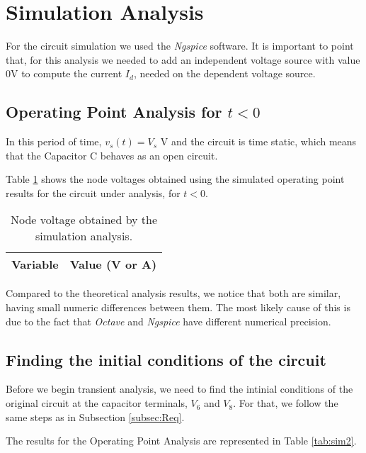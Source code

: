 \section{Simulation Analysis}
\label{sec:simulation}

For the circuit simulation we used the \textit{Ngspice} software. It is important to point that, for this analysis we needed to add an independent voltage source with value 0V to compute the current $I_d$, needed on the dependent voltage source.

\subsection{Operating Point Analysis for $t<0$}
\label{subsec:op_point}

In this period of time, $v_s (t)= V_s$ V and the circuit is time static, which means that the Capacitor C behaves as an open circuit. 

Table \ref{tab:sim1} shows the node voltages obtained using the simulated operating point results for the circuit under analysis, for $t<0$.
\begin{table}[H]
  \centering
  \begin{tabular}{|l|r|}
    \hline    
    {\bf Variable} & {\bf Value (V or A)} \\ \hline
    
  \end{tabular}
  \caption{Node voltage obtained by the simulation analysis.}
  \label{tab:sim1}
\end{table}

Compared to the theoretical analysis results, we notice that both are similar, having small numeric differences between them. The most likely cause of this is due to the fact that \textit{Octave} and \textit{Ngspice} have different numerical precision.

\newpage

\subsection{Finding the initial conditions of the circuit}
\label{subsec:init_conds}

Before we begin transient analysis, we need to find the intinial conditions of the original circuit at the capacitor terminals, $V_6$ and $V_8$. For that, we follow the same steps as in Subsection \ref{subsec:Req}.
\par
The results for the Operating Point Analysis are represented in Table \ref{tab:sim2}.

